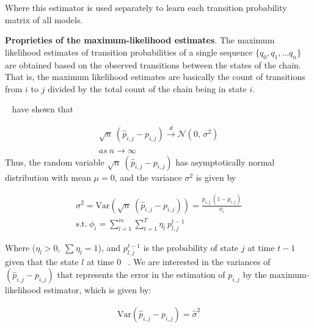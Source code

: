 Where this estimator is used separately to learn each transition probability matrix of all \pmcmr models.   


\textbf{Proprieties of the maximum-likelihood estimates}. 
	The maximum likelihood estimates of transition probabilities of a single sequence $\{q_0, q_1, \ldots q_n\}$  are obtained based on the observed transitions between the states of the chain. That is, the maximum likelihood estimates are basically the count of transitions from $i$ to $j$ divided by the total count of the chain being in state $i$.  
	
	\par ~\citet{anderson1957statistical} have shown that 
	
	

	\begin{equation}
	\begin{aligned}
	\label{eq:lim_dist}
	 \sqrt{n}\ (\hat{p}_{i,j} - {p}_{i,j}) \xrightarrow{d} \mathcal{N}(0,\,\sigma^{2})\\
	 as\ n \xrightarrow{} \infty
	 \end{aligned}
	\end{equation}
Thus, the random variable $\sqrt{n}\ (\hat{p}_{i,j} - {p}_{i,j})$ has asymptotically normal distribution with mean $\mu=0$, and the variance $\sigma^{2}$ is given by   

\begin{equation}
\begin{aligned}
\sigma^{2}=\mathrm{Var}(\sqrt{n}\ (\hat{p}_{i,j} - {p}_{i,j})) = \frac {{p}_{i,j}\ (1- {p}_{i,j})} {\phi_{i}} \\
\text{s.t.}\ \phi_{i} = \sum_{l=1}^{m} \sum_{t=1}^{T} \eta_{l} \ p_{l,j}^{t-1}
\end{aligned}
\end{equation}

Where ($\eta_{l} > 0,\ \sum_{} \eta_{l}=1$), and $p_{l,j}^{t-1}$ is the probability of state $j$ at time $t-1$ given that the state $l$ at time $0$ ~\cite{anderson1957statistical}. We are interested in the variances of $(\hat{p}_{i,j} - {p}_{i,j})$ that represents the error in the estimation of ${p}_{i,j}$ by the maximum-likelihood estimator, which is given by:

\begin{equation}
\begin{aligned}
\mathrm{Var} (\hat{p}_{i,j} - {p}_{i,j})=\widehat{\sigma}^{2}\\
\end{aligned}
\end{equation}

